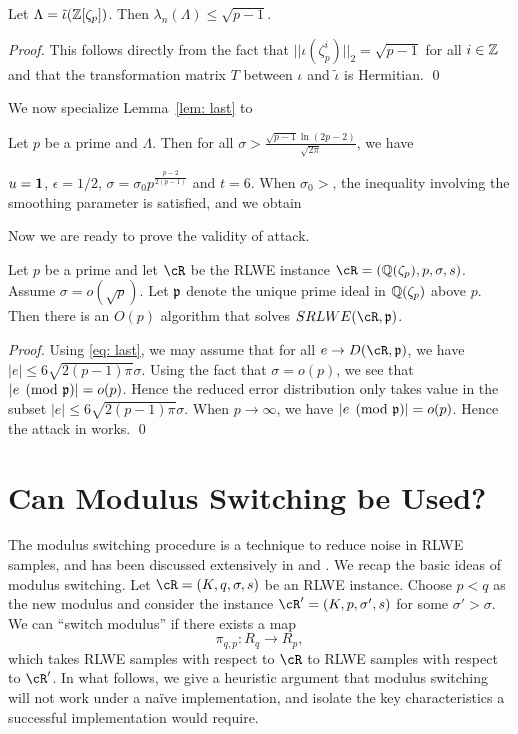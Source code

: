 \documentclass[envcountsame]{llncs}
\begin{document}
\begin{lemma}
Let $\Lambda = \tilde{\iota}(\mathbb{Z}[\zeta_p])$. Then $\lambda_n(\Lambda) \leq \sqrt{p-1}$.
\end{lemma}

\begin{proof}
This follows directly from the fact that $||\iota(\zeta_p^i)||_2 = \sqrt{p-1}$ for all $i \in \mathbb{Z}$ and that the transformation matrix $T$ between $\iota$ and $\tilde{\iota}$ is Hermitian.
\qed \end{proof}


We now specialize Lemma~\ref{lem: last} to

\begin{proposition}
Let $p$ be a prime and $\Lambda$. Then for all $\sigma > \frac{\sqrt{p-1} \ln(2p-2)}{\sqrt{2 \pi}}$, we have
\end{proposition}
$u = {\bf 1}$, $\epsilon = 1/2$, $\sigma = \sigma_0 p^{\frac{p-2}{2(p-1)}}$ and $t = 6$. When $\sigma_0 > $, the inequality involving the smoothing parameter is satisfied, and we obtain

Now we are ready to prove the validity of attack.
\begin{theorem}
Let $p$ be a prime and let $\cR$ be the RLWE instance $\cR = (\bQ(\zeta_p), p, \sigma,s)$.
Assume $\sigma = o(\sqrt{p})$. Let $\mathfrak{p}$ denote the unique prime ideal in $\mathbb{Q}(\zeta_p)$ above $p$. Then there is an $O(p)$ algorithm that solves $SRLWE(\cR,\fp)$.
\end{theorem}

\begin{proof}
Using \ref{eq: last}, we may assume that for all $e \to D(\cR,\fp)$, we have $|e|\leq 6\sqrt{2(p-1)\pi} \sigma$. Using the fact that $\sigma = o(p)$, we see that $|e \pmod{\mathfrak{p}}| = o(p)$. Hence the reduced error distribution only takes value in the subset
$|e|\leq 6\sqrt{2(p-1)\pi} \sigma$. When $p \to \infty$, we have $|e \pmod {\mathfrak{p}}| = o(p)$.  Hence the attack in \cite{elos2015weak} works.
\qed \end{proof}
\fi

\section{Can Modulus Switching be Used?}

The modulus switching procedure is a technique to reduce noise
in RLWE samples, and has been discussed extensively in  \cite{brakerski2012leveled} and \cite{langlois2014worst}.
We recap the basic ideas of modulus switching. Let $\cR = (K, q, \sigma, s)$ be an RLWE instance. Choose $p < q$ as the new modulus and consider the instance $\cR' = (K,p,\sigma',s)$ for some $\sigma' > \sigma$.  We can ``switch modulus'' if there exists a map
\[
\pi_{q,p} : R_q \to R_p,
\]
which takes RLWE samples with respect to $\cR$ to RLWE samples with respect to $\cR'$.  In what follows, we give a heuristic argument that modulus switching will not work under a na\"ive implementation, and isolate the key characteristics a successful implementation would require.
\end{document}
